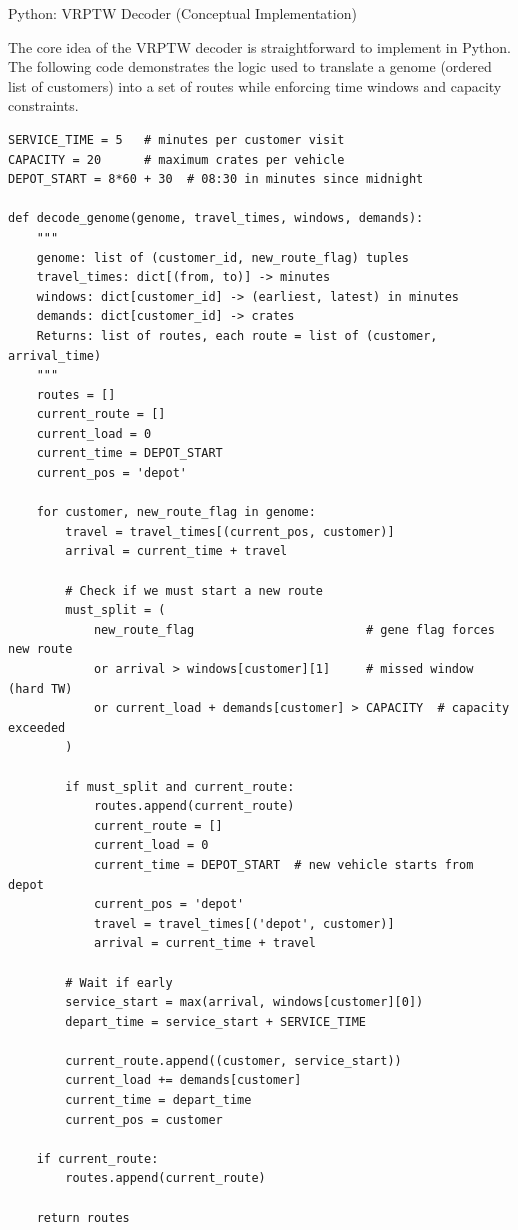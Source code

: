 \documentclass[aspectratio=169,10pt]{beamer}
\begin{document}
\begin{frame}[fragile]{Python: VRPTW Decoder (Conceptual Implementation)}

  The core idea of the VRPTW decoder is straightforward to implement in Python.
  The following code demonstrates the logic used to translate a genome (ordered
  list of customers) into a set of routes while enforcing time windows and
  capacity constraints.

\begin{lstlisting}[caption={VRPTW Decoder in Python}]
SERVICE_TIME = 5   # minutes per customer visit
CAPACITY = 20      # maximum crates per vehicle
DEPOT_START = 8*60 + 30  # 08:30 in minutes since midnight

def decode_genome(genome, travel_times, windows, demands):
    """
    genome: list of (customer_id, new_route_flag) tuples
    travel_times: dict[(from, to)] -> minutes
    windows: dict[customer_id] -> (earliest, latest) in minutes
    demands: dict[customer_id] -> crates
    Returns: list of routes, each route = list of (customer, arrival_time)
    """
    routes = []
    current_route = []
    current_load = 0
    current_time = DEPOT_START
    current_pos = 'depot'

    for customer, new_route_flag in genome:
        travel = travel_times[(current_pos, customer)]
        arrival = current_time + travel

        # Check if we must start a new route
        must_split = (
            new_route_flag                        # gene flag forces new route
            or arrival > windows[customer][1]     # missed window (hard TW)
            or current_load + demands[customer] > CAPACITY  # capacity exceeded
        )

        if must_split and current_route:
            routes.append(current_route)
            current_route = []
            current_load = 0
            current_time = DEPOT_START  # new vehicle starts from depot
            current_pos = 'depot'
            travel = travel_times[('depot', customer)]
            arrival = current_time + travel

        # Wait if early
        service_start = max(arrival, windows[customer][0])
        depart_time = service_start + SERVICE_TIME

        current_route.append((customer, service_start))
        current_load += demands[customer]
        current_time = depart_time
        current_pos = customer

    if current_route:
        routes.append(current_route)

    return routes
\end{lstlisting}

\end{frame}
\end{document}

